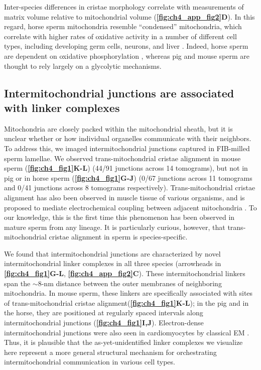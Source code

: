 Inter-species differences in cristae morphology correlate with measurements of matrix volume relative to mitochondrial volume (\textbf{\autoref{fig:ch4_app_fig2}D}). In this regard, horse sperm mitochondria resemble “condensed” mitochondria, which correlate with higher rates of oxidative activity in a number of different cell types, including developing germ cells, neurons, and liver \cite{DeMartino1979, Perkins2011, Hackenbrock1968}. Indeed, horse sperm are dependent on oxidative phosphorylation \cite{Davila2016}, whereas pig \cite{Marin2003} and mouse sperm \cite{Mukai2004, Odet2013} are thought to rely largely on a glycolytic mechanisms.%
%
\subsection*{Intermitochondrial junctions are associated with linker complexes}
Mitochondria are closely packed within the mitochondrial sheath, but it is unclear whether or how individual organelles communicate with their neighbors. To address this, we imaged intermitochondrial junctions captured in FIB-milled sperm lamellae. We observed trans-mitochondrial cristae alignment in mouse sperm \linebreak (\textbf{\autoref{fig:ch4_fig1}K-L}) (44/91 junctions across 14 tomograms), but not in pig or in horse sperm (\textbf{\autoref{fig:ch4_fig1}G-J}) (0/67 junctions across 11 tomograms and 0/41 junctions across 8 tomograms respectively). Trans-mitochondrial cristae alignment has also been observed in muscle tissue of various organisms, and is proposed to mediate electrochemical coupling between adjacent mitochondria \cite{Picard2015}. To our knowledge, this is the first time this phenomenon has been observed in mature sperm from any lineage. It is particularly curious, however, that trans-mitochondrial cristae alignment in sperm is species-specific.

We found that intermitochondrial junctions are characterized by novel intermitochondrial linker complexes in all three species (arrowheads in \textbf{\autoref{fig:ch4_fig1}G-L}, \textbf{\autoref{fig:ch4_app_fig2}C}). These intermitochondrial linkers span the $\sim$8-nm distance between the outer membranes of neighboring mitochondria. In mouse sperm, these linkers are specifically associated with sites of trans-mitochondrial cristae alignment\linebreak (\textbf{\autoref{fig:ch4_fig1}K-L}); in the pig and in the horse, they are positioned at regularly spaced intervals along intermitochondrial junctions (\textbf{\autoref{fig:ch4_fig1}I,J}). Electron-dense intermitochondrial junctions were also seen in cardiomyocytes by classical EM \cite{Huang2013, Picard2015, Duvert1985}. Thus, it is plausible that the as-yet-unidentified linker complexes we visualize here represent a more general structural mechanism for orchestrating intermitochondrial communication in various cell types.
%
